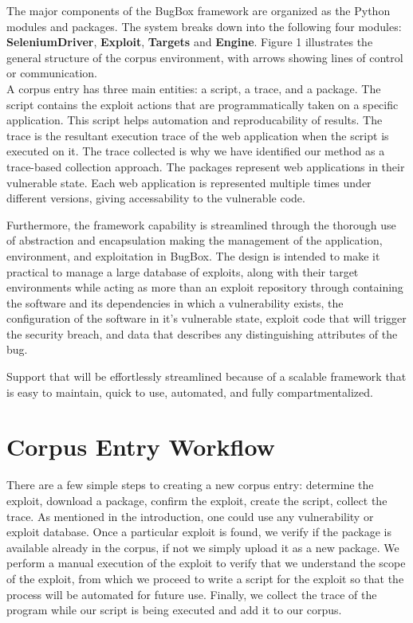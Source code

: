 \documentclass[letterpaper,twocolumn,10pt]{article}
\begin{document}
The major components of the BugBox framework are organized as the Python modules and packages. The system breaks down into the following four modules: {\bf SeleniumDriver}, {\bf Exploit},  {\bf Targets} and {\bf Engine}.  Figure 1 illustrates the general structure of the corpus environment, with arrows showing lines of control or communication. \\  

A corpus entry has three main entities: a script, a trace, and a package.  The script contains the exploit actions that are programmatically taken on a specific application.  This script helps automation and reproducability of results.  The trace is the resultant execution trace of the web application when the script is executed on it.  The trace collected is why we have identified our method as a trace-based collection approach.  The packages represent web applications in their vulnerable state.  Each web application is represented multiple times under different versions, giving accessability to the vulnerable code. 



  Furthermore, the framework capability is streamlined through the thorough use of abstraction and encapsulation making the management of the application, environment, and exploitation in BugBox. 
 The design is intended to make it practical to manage a large database of exploits, along with their target environments while acting as more than an exploit repository through containing the software and its dependencies in which a vulnerability exists, the configuration of the software in it's vulnerable state, exploit code that will trigger the security breach, and data that describes any distinguishing attributes of the bug.

Support that will be effortlessly streamlined because of a scalable framework that is easy to maintain, quick to use, automated, and fully compartmentalized.  




\section{Corpus Entry Workflow}

There are a few simple steps to creating a new corpus entry: determine the exploit, download a package, confirm the exploit, create the script, collect the trace.  As mentioned in the introduction, one could use any vulnerability or exploit database.   Once a particular exploit is found, we verify if the package is available already in the corpus, if not we simply upload it as a new package.  We perform a manual execution of the exploit to verify that we understand the scope of the exploit, from which we proceed to write a script for the exploit so that the process will be automated for future use.  Finally, we collect the trace of the program while our script is being executed and add it to our corpus.
\end{document}
